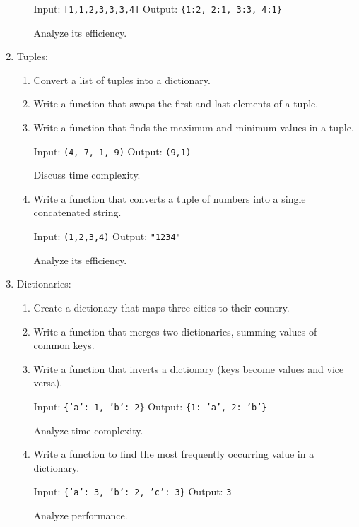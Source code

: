 \documentclass{article}
\begin{document}
\begin{enumerate}
\begin{enumerate}
        Input: \texttt{[1,1,2,3,3,3,4]}
        Output: \texttt{\{1:2, 2:1, 3:3, 4:1\}}
        
        Analyze its efficiency.
    \end{enumerate}
    
    \item Tuples:
    
    \begin{enumerate}
        \item Convert a list of tuples into a dictionary.
        \item Write a function that swaps the first and last elements of a tuple.
        \item Write a function that finds the maximum and minimum values in a tuple.
        
        Input: \texttt{(4, 7, 1, 9)}
        Output: \texttt{(9,1)}
        
        Discuss time complexity.
        
        \item Write a function that converts a tuple of numbers into a single concatenated string.
        
        Input: \texttt{(1,2,3,4)}
        Output: \texttt{"1234"}
        
        Analyze its efficiency.
    \end{enumerate}
    
    \item Dictionaries:
    
    \begin{enumerate}
        \item Create a dictionary that maps three cities to their country.
        \item Write a function that merges two dictionaries, summing values of common keys.
        \item Write a function that inverts a dictionary (keys become values and vice versa).
        
        Input: \texttt{\{'a': 1, 'b': 2\}}
        Output: \texttt{\{1: 'a', 2: 'b'\}}
        
        Analyze time complexity.
        
        \item Write a function to find the most frequently occurring value in a dictionary.
        
        Input: \texttt{\{'a': 3, 'b': 2, 'c': 3\}}
        Output: \texttt{3}
        
        Analyze performance.
    \end{enumerate}
    

\end{enumerate}
\end{document}

